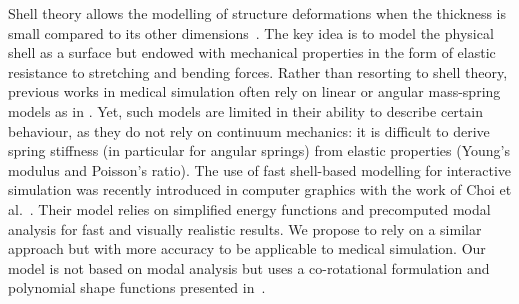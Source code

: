 \documentclass{llncs}
\begin{document}
Shell theory allows the modelling of structure deformations when the thickness is small compared to its other dimensions~\cite{Liu03}. The key idea is to model the physical shell as a surface but endowed with mechanical properties in the form of elastic resistance to stretching and bending forces. Rather than resorting to shell theory, previous works in medical simulation often rely on linear or angular mass-spring models as in \cite{Nedel98,Hammer08}. Yet, such models are limited in their ability to describe certain behaviour, as they do not rely on continuum mechanics: it is difficult to derive spring stiffness (in particular for angular springs) from elastic properties (Young's modulus and Poisson's ratio). The use of fast shell-based modelling for interactive simulation was recently introduced in computer graphics with the work of Choi et al.~\cite{Choi07}. Their model relies on simplified energy functions and precomputed modal analysis for fast and visually realistic results. We propose to rely on a similar approach but with more accuracy to be applicable to medical simulation. Our model is not based on modal analysis but uses a co-rotational formulation and polynomial shape functions presented in~\cite{Comas10}. 
\end{document}
